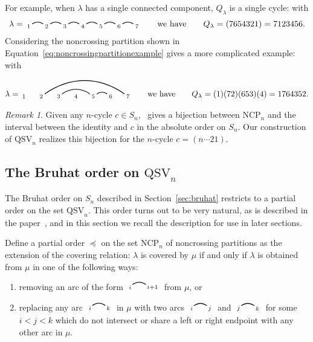 \documentclass[12pt]{amsart}
\theoremstyle{definition}
\theoremstyle{remark}
\newtheorem{rem}[equation]{Remark}
\numberwithin{equation}{section}
\newcommand{\QSV}{\mathrm{QSV}}
\newcommand{\NCP}{\mathrm{NCP}}
\newcommand{\edge}[2]{\tikz[scale = 0.75, baseline = -0.2cm]{
\draw (0.1, 0) node[inner sep = 0ex] (a) {};
\node[left, xshift = 0.1cm, yshift = -0.1cm] at (a) {$\scriptstyle #1$};
\draw (0.9, 0)  node[inner sep = 0ex] (b) {};
\node[right, xshift = -0.1cm, yshift = -0.1cm] at (b) {$\scriptstyle #2$};
\draw[thick] (a) to[out = 35, in = 145] (b);}}
\begin{document}
For example, when $\lambda$ has a single connected component, $Q_{\lambda}$ is a single cycle: with
\[
\lambda = \begin{tikzpicture}[scale = 0.75, baseline = 0.75*-0.2]
\foreach \x in {1, ..., 7}{\draw[fill] (\x - 1, 0) node[inner sep = 2pt] (\x) {$\scriptstyle \x$};}
\foreach \i\j in {1/2, 2/3, 3/4, 4/5, 5/6, 6/7}{\draw[thick] (\i) to[out = 35, in = 145] (\j);}
\end{tikzpicture}
\qquad\text{we have}\qquad
Q_{\lambda} = (7654321) = 7123456.
\]
Considering the noncrossing partition shown in Equation~\eqref{eq:noncrossingpartitionexample} gives a more complicated example: with
\[
\lambda = \begin{tikzpicture}[scale = 0.75, baseline = 0.75*-0.2]
\foreach \x in {1, ..., 7}{\draw[fill] (\x - 1, 0) node[inner sep = 2pt] (\x) {$\scriptstyle \x$};}
\foreach \i\j in {5/6, 3/5,2/7}{\draw[thick] (\i) to[out = 35, in = 145] (\j);}
\end{tikzpicture}
\qquad\text{we have}\qquad
Q_{\lambda} = (1)(72)(653)(4) = 1764352.
\]

\begin{rem}
\label{rem:QSVnoncrossing}
Given any $n$-cycle $c \in S_{n}$,~\cite{Baine} gives a bijection between $\NCP_{n}$ and the interval between the identity and $c$ in the absolute order on $S_{n}$.  Our construction of $\QSV_{n}$ realizes this bijection for the $n$-cycle $c = (n\cdots 21)$.  
\end{rem}

\subsection{The Bruhat order on $\QSV_{n}$}
\label{sec:bruhatballot}

The Bruhat order on $S_{n}$ described in Section~\ref{sec:bruhat} restricts to a partial order on the set $\QSV_{n}$.
This order turns out to be very natural, as is described in the paper~\cite{GobetWilliams}, and in this section we recall the description for use in later sections.

Define a partial order $\preceq$ on the set $\NCP_{n}$ of noncrossing partitions as the extension of the covering relation: $\lambda$ is covered by $\mu$ if and only if $\lambda$ is obtained from $\mu$ in one of the following ways:
\begin{enumerate}
\item removing an arc of the form $ \edge{i}{i+1}$ from $\mu$, or

\item replacing any arc $ \edge{i}{k}$ in $\mu$ with two arcs $ \edge{i}{j}$ and $ \edge{j}{k}$ for some $i < j < k$ which do not intersect or share a left or right endpoint with any other arc in $\mu$.

\end{enumerate}
\end{document}
